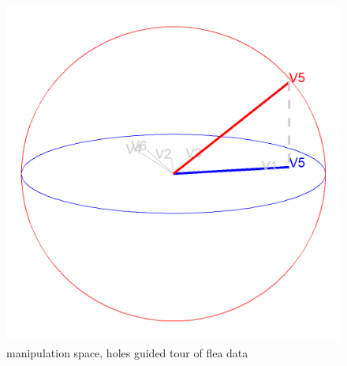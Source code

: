 \documentclass{monashthesis}
\begin{document}
\begin{figure}
\includegraphics[width=16.67in]{./output/step2_manip_sp} \caption{manipulation space, holes guided tour of flea data}\label{fig:step2}
\end{figure}
\end{document}
